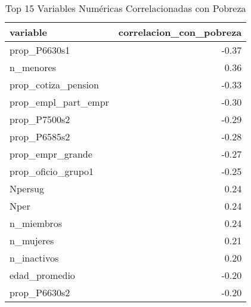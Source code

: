 \begin{table}[ht]
\centering
\begin{tabular}{lr}
  \toprule
variable & correlacion\_con\_pobreza \\ 
  \midrule
prop\_P6630s1 & -0.37 \\ 
  n\_menores & 0.36 \\ 
  prop\_cotiza\_pension & -0.33 \\ 
  prop\_empl\_part\_empr & -0.30 \\ 
  prop\_P7500s2 & -0.29 \\ 
  prop\_P6585s2 & -0.28 \\ 
  prop\_empr\_grande & -0.27 \\ 
  prop\_oficio\_grupo1 & -0.25 \\ 
  Npersug & 0.24 \\ 
  Nper & 0.24 \\ 
  n\_miembros & 0.24 \\ 
  n\_mujeres & 0.21 \\ 
  n\_inactivos & 0.20 \\ 
  edad\_promedio & -0.20 \\ 
  prop\_P6630s2 & -0.20 \\ 
   \bottomrule
\end{tabular}
\caption{Top 15 Variables Numéricas Correlacionadas con Pobreza} 
\label{tab:poverty_correlation}
\end{table}
